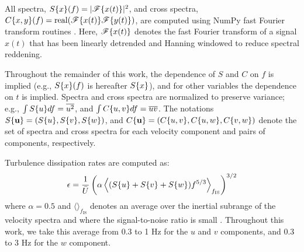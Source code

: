 All spectra, $S\{x\}(f)=|\mathscr{F}\{x(t)\}|^2$, and cross spectra, $C\{x,y\}(f)=\mathrm{real}(\mathscr{F}\{x(t)\}\mathscr{F}\{y(t)\})$, are computed using NumPy fast Fourier transform routines \cite[]{Walt++2011}. Here, $\mathscr{F}\{x(t)\}$ denotes the fast Fourier transform of a signal $x(t)$ that has been linearly detrended and Hanning windowed to reduce spectral reddening.  

Throughout the remainder of this work, the dependence of $S$ and $C$ on $f$ is implied (e.g., $S\{x\}(f)$ is hereafter $S\{x\}$), and for other variables the dependence on $t$ is implied. Spectra and cross spectra are normalized to preserve variance; e.g., $\int S\{u\}df = \overline{u^2}$, and  $\int C\{u,v\}df = \overline{uv}$. The notations $S\{\mathbf{u}\}=(S\{u\}, S\{v\}, S\{w\})$, and $C\{\mathbf{u}\} = (C\{u,v\}, C\{u,w\}, C\{v,w\} )$ denote the set of spectra and cross spectra for each velocity component and pairs of components, respectively.

Turbulence dissipation rates are computed as:
\begin{align}
  \epsilon = \frac{1}{\bar{U}}\left(\alpha\left\langle(S\{u\}+S\{v\}+S\{w\})f^{5/3}\right\rangle_{f_\mathrm{IS}}\right)^{3/2}
\end{align}
where  $\alpha=0.5$ and $\langle\rangle_{f_\mathrm{IS}}$ denotes an average over the inertial subrange of the velocity spectra and where the signal-to-noise ratio is small \cite[]{Lumley+Terray1983,Sreenivasan1995}. Throughout this work, we take this average from 0.3 to 1 Hz for the $u$ and $v$ components, and 0.3 to 3 Hz for the $w$ component.

